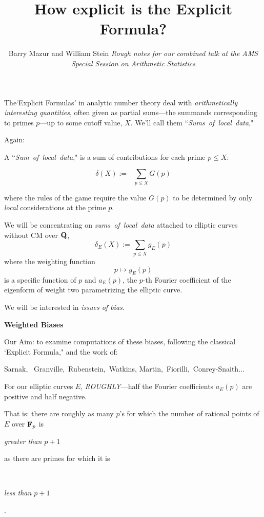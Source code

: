 \documentclass[12pt]{beamer}
\title[How explicit is the Explicit Formula?] 
{How explicit is the Explicit Formula?}
\author[Barry Mazur and William Stein]{ Barry Mazur and William Stein\vskip30pt  {\it Rough notes for our combined talk at the  AMS Special Session on Arithmetic Statistics}}
\theoremstyle{definition}
\def\Q{\bf {Q}}
\begin{document}
\begin{frame}
\titlepage
\end{frame}
\begin{frame}\vskip30pt 
{\Large The`Explicit Formulas' in analytic number theory deal with  {\it arithmetically interesting quantities}, often given as partial sums---the summands  corresponding to primes $p$---up to some cutoff value, $X$. We'll call them {``{\it Sums\ of\ local\ data},"}
\vskip40pt
\centerline{Again:}}
\end{frame}
\begin{frame}\vskip20pt
{\Large 
   A  {``{\it Sum\ of\ local\ data},"} is a sum of contributions for each prime $ p \le X$:

  $$\delta(X):=\ \ \  \sum_{p\le X}G(p)$$
  
  where the rules of the game require the value $G(p)$ to be determined by only {\it local }considerations at the prime $p$.} \end{frame}\begin{frame}\vskip20pt
{\Large 

We will be concentrating on  {\it sums\ of\ local\ data}  attached to elliptic curves without CM over ${\Q}$,   $$\delta_E(X):=\sum_{p\le X}g_E(p)$$ where the weighting function $$p \mapsto g_E(p)$$   is a specific function of $p$ and $a_E(p)$, the $p$-th Fourier coefficient of the eigenform of weight two parametrizing the elliptic curve.}  \end{frame}\begin{frame}\vskip20pt
{\Large 

  We will  be interested in  {\it issues of bias.} \vskip40pt  \centerline{\bf Weighted Biases}} \end{frame}\begin{frame}\vskip20pt
{\Large  \vskip20pt

Our Aim: to examine computations of these biases, following the classical `Explicit Formula," and the work of:
 
\vskip40pt
Sarnak, \ Granville,\  Rubenstein,\ Watkins,\vskip30pt \hskip40pt Martin,\ Fiorilli,\ Conrey-Snaith$\dots$ } \end{frame}\begin{frame}\vskip20pt
{\Large  \vskip20pt 
 For our elliptic curves $E$,\vskip20pt
 {\it ROUGHLY}---half the Fourier coefficients  $a_E(p)$ are positive and half negative.  } \end{frame}\begin{frame}\vskip20pt
{\Large \vskip20pt  That is: there are roughly as many $p$'s for which the number of rational points of $E$ over ${\bf F}_p$ is \vskip20pt \centerline{\it greater than $p+1$}  \vskip30pt \centerline{as there are primes for which it is} \vskip20pt \ \centerline{\it less than $p+1$}.       }  \end{frame}
\end{document}
